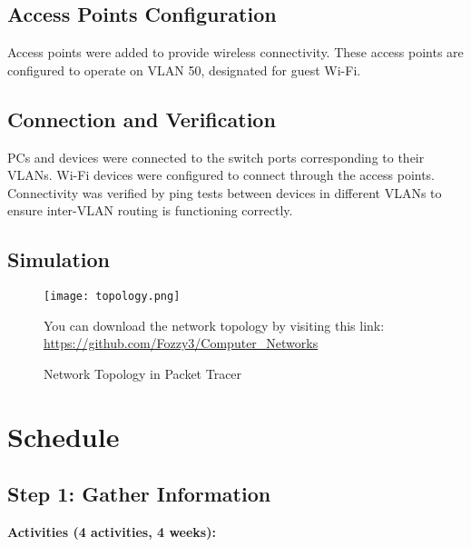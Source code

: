 \documentclass[12pt]{article}
\begin{document}
\subsection{Access Points Configuration}

Access points were added to provide wireless connectivity. These access points are configured to operate on VLAN 50, designated for guest Wi-Fi.

\subsection{Connection and Verification}

PCs and devices were connected to the switch ports corresponding to their VLANs. Wi-Fi devices were configured to connect through the access points. Connectivity was verified by ping tests between devices in different VLANs to ensure inter-VLAN routing is functioning correctly.
\newpage

\subsection{Simulation}

\begin{figure}[h!]
    \centering
    \texttt{[image: topology.png]}
    \caption{Network Topology in Packet Tracer}
    \label{fig:network_topology}
    \bigskip
    \centering
    \vspace*{\fill}
    \vspace*{\fill}
    You can download the network topology by visiting this link: \href{https://github.com/Fozzy3/Computer_Networks}{https://github.com/Fozzy3/Computer_Networks}
\end{figure}


\newpage
\newpage
\section{Schedule}

\subsection{Step 1: Gather Information}

\textbf{Activities (4 activities, 4 weeks):}
\end{document}
